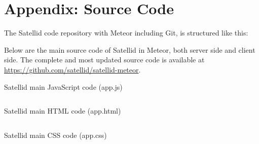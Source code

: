 \chapter{Appendix: Source Code}
\label{apx:source-code}

The Satellid code repository with Meteor including Git, is structured like this:


\noindent Below are the main source code of Satellid in Meteor, both server side and client side.
The complete and most updated source code is available at \url{https://github.com/satellid/satellid-meteor}.

\begin{listing}[!ht]
  \caption{Satellid main JavaScript code (app.js)}
  \inputminted{javascript}{\dir/code/app.js}
  \label{lst:satellid-code-js}
\end{listing}

\begin{listing}[!ht]
  \caption{Satellid main HTML code (app.html)}
  \inputminted{html}{\dir/code/app.html}
  \label{lst:satellid-code-html}
\end{listing}

\begin{listing}[!ht]
  \caption{Satellid main CSS code (app.css)}
  \inputminted{css}{\dir/code/app.css}
  \label{lst:satellid-code-css}
\end{listing}

